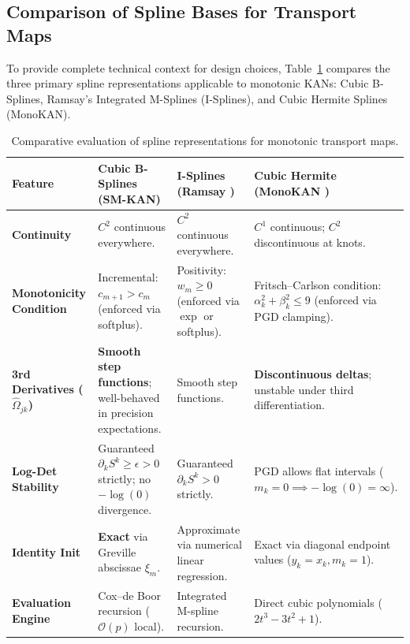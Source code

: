 \documentclass[11pt,a4paper]{article}
\theoremstyle{plain}
\theoremstyle{definition}
\theoremstyle{remark}
\begin{document}
\subsection{Comparison of Spline Bases for Transport Maps}

To provide complete technical context for design choices, Table~\ref{tab:spline_comparison} compares the three primary spline representations applicable to monotonic KANs: Cubic B-Splines, Ramsay's Integrated M-Splines (I-Splines), and Cubic Hermite Splines (MonoKAN).

\begin{table}[htbp]
\centering
\small
\caption{Comparative evaluation of spline representations for monotonic transport maps.}
\label{tab:spline_comparison}
\begin{tabular}{p{} p{} p{} p{}}
\toprule
\textbf{Feature} & \textbf{Cubic B-Splines (SM-KAN)} & \textbf{I-Splines (Ramsay \cite{ramsay1988monotone})} & \textbf{Cubic Hermite (MonoKAN \cite{polomolina2025monokan})} \\
\midrule
\textbf{Continuity} & $C^2$ continuous everywhere. & $C^2$ continuous everywhere. & $C^1$ continuous; $C^2$ discontinuous at knots. \\
\addlinespace
\textbf{Monotonicity Condition} & Incremental: $c_{m+1} > c_m$ (enforced via softplus). & Positivity: $w_m \ge 0$ (enforced via $\exp$ or softplus). & Fritsch--Carlson condition: $\alpha_k^2 + \beta_k^2 \le 9$ (enforced via PGD clamping). \\
\addlinespace
\textbf{3rd Derivatives ($\hat{\Omega}_{jk}$)} & \textbf{Smooth step functions}; well-behaved in precision expectations. & Smooth step functions. & \textbf{Discontinuous deltas}; unstable under third differentiation. \\
\addlinespace
\textbf{Log-Det Stability} & Guaranteed $\partial_k S^k \ge \epsilon > 0$ strictly; no $-\log(0)$ divergence. & Guaranteed $\partial_k S^k > 0$ strictly. & PGD allows flat intervals ($m_k = 0 \implies -\log(0) = \infty$). \\
\addlinespace
\textbf{Identity Init} & \textbf{Exact} via Greville abscissae $\xi_m$. & Approximate via numerical linear regression. & Exact via diagonal endpoint values ($y_k = x_k, m_k = 1$). \\
\addlinespace
\textbf{Evaluation Engine} & Cox--de Boor recursion ($\mathcal{O}(p)$ local). & Integrated M-spline recursion. & Direct cubic polynomials ($2t^3 - 3t^2 + 1$). \\
\bottomrule
\end{tabular}
\end{table}
\end{document}
